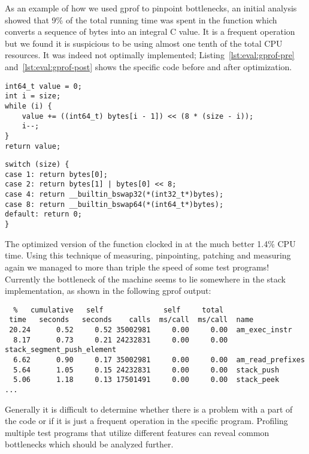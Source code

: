 As an example of how we used gprof to pinpoint bottlenecks, an initial analysis
showed that 9\% of the total running time was spent in the function
 which converts a sequence of bytes into an integral C value. It
is a frequent operation but we found it is suspicious to be using almost one
tenth of the total CPU resources. It was indeed not optimally
implemented; Listing~\ref{lst:eval:gprof-pre} and~\ref{lst:eval:gprof-post}
shows the specific code before and after optimization.

\begin{minipage}{\linewidth}
\begin{lstlisting}[language={[ANSI]C},%
  caption={The function \code{bytes2int} before optimization.},%
  label={lst:eval:gprof-pre}]
int64_t value = 0;
int i = size;
while (i) {
    value += ((int64_t) bytes[i - 1]) << (8 * (size - i));
    i--;
}
return value;
\end{lstlisting}

\begin{lstlisting}[language={[ANSI]C},%
  caption={The function \code{bytes2int} after optimization},%
  label={lst:eval:gprof-post}]
switch (size) {
case 1: return bytes[0];
case 2: return bytes[1] | bytes[0] << 8;
case 4: return __builtin_bswap32(*(int32_t*)bytes);
case 8: return __builtin_bswap64(*(int64_t*)bytes);
default: return 0;
}
\end{lstlisting}
\end{minipage}

The optimized version of the function clocked in at the much better 1.4\% CPU
time. Using this technique of measuring, pinpointing, patching and measuring
again we managed to more than triple the speed of some test programs! Currently
the bottleneck of the machine seems to lie somewhere in the stack
implementation, as shown in the following gprof output:

\begin{verbatim}
  %   cumulative   self              self     total
 time   seconds   seconds    calls  ms/call  ms/call  name
 20.24      0.52     0.52 35002981     0.00     0.00  am_exec_instr
  8.17      0.73     0.21 24232831     0.00     0.00  stack_segment_push_element
  6.62      0.90     0.17 35002981     0.00     0.00  am_read_prefixes
  5.64      1.05     0.15 24232831     0.00     0.00  stack_push
  5.06      1.18     0.13 17501491     0.00     0.00  stack_peek
...
\end{verbatim}

Generally it is difficult to determine whether there is a problem with a part of
the code or if it is just a frequent operation in the specific
program. Profiling multiple test programs that utilize different features can
reveal common bottlenecks which should be analyzed further.

